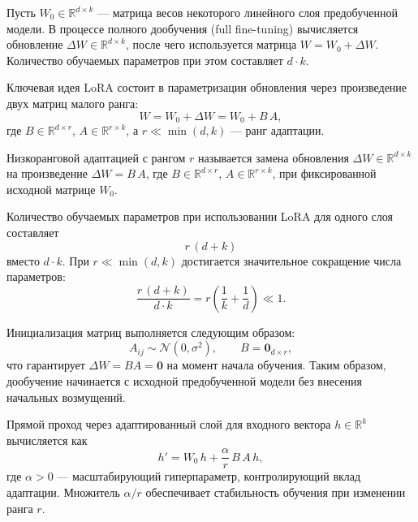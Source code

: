 Пусть $W_0 \in \mathbb{R}^{d \times k}$ --- матрица весов некоторого
линейного слоя предобученной модели. В процессе полного дообучения
(full fine-tuning) вычисляется обновление $\Delta W \in \mathbb{R}^{d \times k}$,
после чего используется матрица $W = W_0 + \Delta W$.
Количество обучаемых параметров при этом составляет $d \cdot k$.

Ключевая идея LoRA состоит в параметризации обновления через произведение
двух матриц малого ранга:
\begin{equation}
    W = W_0 + \Delta W = W_0 + B\,A,
    \label{eq:lora-decomposition}
\end{equation}
где $B \in \mathbb{R}^{d \times r}$, $A \in \mathbb{R}^{r \times k}$,
а $r \ll \min(d, k)$ --- ранг адаптации.

\begin{definition}
\label{def:lora}
Низкоранговой адаптацией с рангом $r$ называется замена обновления
$\Delta W \in \mathbb{R}^{d \times k}$ на произведение
$\Delta W = B\,A$, где $B \in \mathbb{R}^{d \times r}$,
$A \in \mathbb{R}^{r \times k}$, при фиксированной исходной матрице $W_0$.
\end{definition}

Количество обучаемых параметров при использовании LoRA для одного слоя
составляет
\begin{equation}
    r\,(d + k)
    \label{eq:lora-params}
\end{equation}
вместо $d \cdot k$. При $r \ll \min(d, k)$ достигается значительное
сокращение числа параметров:
\begin{equation}
    \frac{r\,(d + k)}{d \cdot k}
    = r\left(\frac{1}{k} + \frac{1}{d}\right)
    \ll 1.
    \label{eq:lora-ratio}
\end{equation}

Инициализация матриц выполняется следующим образом:
\begin{equation}
    A_{ij} \sim \mathcal{N}(0, \sigma^2), \qquad B = \mathbf{0}_{d \times r},
    \label{eq:lora-init}
\end{equation}
что гарантирует $\Delta W = BA = \mathbf{0}$ на момент начала обучения.
Таким образом, дообучение начинается с исходной предобученной модели без
внесения начальных возмущений.

Прямой проход через адаптированный слой для входного вектора
$h \in \mathbb{R}^k$ вычисляется как
\begin{equation}
    h' = W_0\,h + \frac{\alpha}{r}\,B\,A\,h,
    \label{eq:lora-forward}
\end{equation}
где $\alpha > 0$ --- масштабирующий гиперпараметр, контролирующий вклад
адаптации. Множитель $\alpha / r$ обеспечивает стабильность обучения
при изменении ранга $r$.


